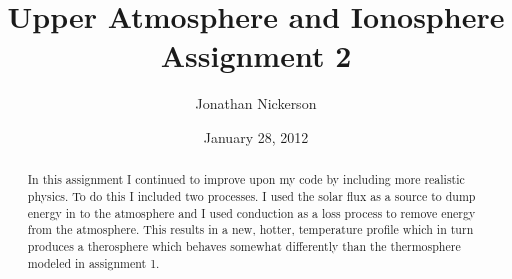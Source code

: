 \documentclass[10pt]{article}
\begin{document}
\title{Upper Atmosphere and Ionosphere Assignment 2}
\author{Jonathan Nickerson}
\date{January 28, 2012}
\maketitle



\begin{abstract}
In this assignment I continued to improve upon my code by including more realistic physics. To do this I included two processes. I used the solar flux as a source to dump energy in to the atmosphere and I used conduction as a loss process to remove energy from the atmosphere. This results in a new, hotter, temperature profile which in turn produces a therosphere which behaves somewhat differently than the thermosphere modeled in assignment 1.
\end{abstract}
\end{document}
